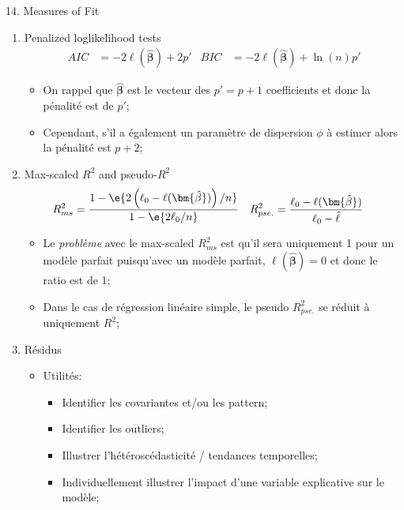 \documentclass[12pt, titlepage, french]{report}
\begin{document}
\begin{CHPT_SUMM}[label = {GLM-MEZ-FIT}]{14. Measures of Fit}
\begin{enumerate}
\begin{itemize}
\begin{itemize}
			\item	Pareillement, lorsqu'on récrit le TRV avec la déviance on retourne à la notation réduit vs complet (avec vs sans contraintes);
			\item	Finalement, on note que la log-vraisemblance du modèle complet (saturé) devrait être supérieure à celle du modèle réduite;
		\end{itemize}
	\end{itemize}
	\item	Penalized loglikelihood tests
	\begin{align*}
		AIC &= -2 \ell(\bm{\hat{\beta}}) + 2 p'	&
		BIC &= -2 \ell(\bm{\hat{\beta}}) + \ln (n) p'
	\end{align*}
	\begin{itemize}
		\item	On rappel que $\bm{\hat{\beta}}$ est le vecteur des $p' = p + 1$ coefficients et donc la pénalité est de $p'$;
		\item	Cependant, s'il a également un paramètre de dispersion $\phi$ à estimer alors la pénalité est $p + 2$;
	\end{itemize}
	\item	Max-scaled $R^{2}$ and pseudo-$R^{2}$
	\begin{align*}
		R^{2}_{ms}	&=	\frac{1 - \e{2\left(\ell_{0} - \ell(\bm{\hat{\beta}})\right)/n}}{1 - \e{2 \ell_{0}/n}}	&
		R^{2}_{pse.}	&=	\frac{\ell_{0} - \ell(\bm{\hat{\beta}})}{\ell_{0} - \hat{\ell}}
	\end{align*}
	\begin{itemize}
		\item	Le \og \textit{problème} \fg{} avec le max-scaled $R^{2}_{ms}$ est qu'il sera uniquement 1 pour un modèle parfait puisqu'avec un modèle parfait, $\ell(\bm{\hat{\beta}}) = 0$ et donc le ratio est de 1;
		\item	Dans le cas de régression linéaire simple, le pseudo $R^{2}_{pse.}$ se réduit à uniquement $R^{2}$;
	\end{itemize}
	\item	Résidus
	\begin{itemize}
		\item	Utilités:
		\begin{itemize}
			\item	Identifier les covariantes et/ou les pattern;
			\item	Identifier les outliers;
			\item	Illustrer l'hétéroscédasticité / tendances temporelles;
			\item	Individuellement illustrer l'impact d'une variable explicative sur le modèle;

\end{itemize}
\end{itemize}
\end{enumerate}
\end{CHPT_SUMM}
\end{document}
